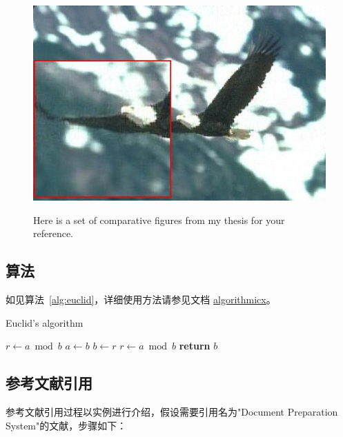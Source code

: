 \begin{figure}
{\begin{minipage}[b]{0.25\linewidth}
			\includegraphics[width=1\textwidth]{pic/fast_img/2/result/ftcn_img1.jpg}
		\end{minipage}
		\hspace{-12pt}
	}
	{Here is a set of comparative figures from my thesis for your reference.}
	\label{fig:oaspl}
\end{figure}

\subsection{算法}

如见算法~\ref{alg:euclid}，详细使用方法请参见文档 \href{https://ctan.org/pkg/algorithmicx?lang=en}{algorithmicx}。

\begin{algorithm}[!htbp]
    \small
    \caption{Euclid's algorithm}\label{alg:euclid}
    \begin{algorithmic}[1]
        \State $r\gets a\bmod b$
        \State $a\gets b$
        \State $b\gets r$
        \State $r\gets a\bmod b$
        \EndWhile\label{euclidendwhile}
        \State \textbf{return} $b$
        \EndProcedure
    \end{algorithmic}
\end{algorithm}

\subsection{参考文献引用}

参考文献引用过程以实例进行介绍，假设需要引用名为"Document Preparation System"的文献，步骤如下：

